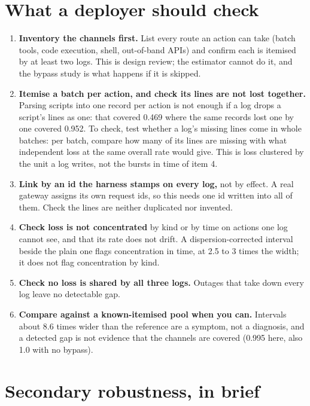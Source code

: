 \documentclass[11pt]{article}
\begin{document}
\section{What a deployer should check}

\begin{enumerate}\setlength\itemsep{1pt}\setlength\parskip{0pt}
\item \textbf{Inventory the channels first.} List every route an action can take (batch
tools, code execution, shell, out-of-band APIs) and confirm each is itemised by at least
two logs. This is design review; the estimator cannot do it, and the bypass study is what
happens if it is skipped.
\item \textbf{Itemise a batch per action, and check its lines are not lost together.}
Parsing scripts into one record per action is not enough if a log drops a script's lines
as one: that covered 0.469 where the same records lost one by one covered 0.952. To check,
test whether a log's missing lines come in whole batches: per batch, compare how many of
its lines are missing with what independent loss at the same overall rate would give. This
is loss clustered by the unit a log writes, not the bursts in time of item 4.
\item \textbf{Link by an id the harness stamps on every log,} not by effect. A real
gateway assigns its own request ids, so this needs one id written into all of them. Check
the lines are neither duplicated nor invented.
\item \textbf{Check loss is not concentrated} by kind or by time on actions one log cannot
see, and that its rate does not drift. A dispersion-corrected interval beside the plain
one flags concentration in time, at 2.5 to 3 times the width; it does not flag
concentration by kind.
\item \textbf{Check no loss is shared by all three logs.} Outages that take down every log
leave no detectable gap.
\item \textbf{Compare against a known-itemised pool when you can.} Intervals about 8.6
times wider than the reference are a symptom, not a diagnosis, and a detected gap is
not evidence that the channels are covered (0.995 here, also 1.0 with no bypass).
\end{enumerate}

\section{Secondary robustness, in brief}
\end{document}
